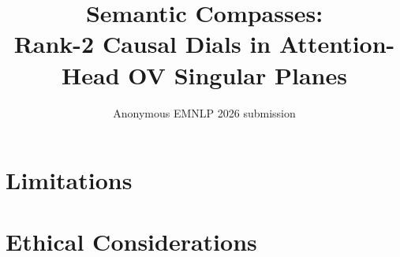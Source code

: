 \documentclass[11pt]{article}
\title{Semantic Compasses:\\
Rank-2 Causal Dials in Attention-Head OV Singular Planes}
\author{Anonymous EMNLP 2026 submission}
\begin{document}
\maketitle









\section*{Limitations}


\section*{Ethical Considerations}




\appendix

\end{document}
